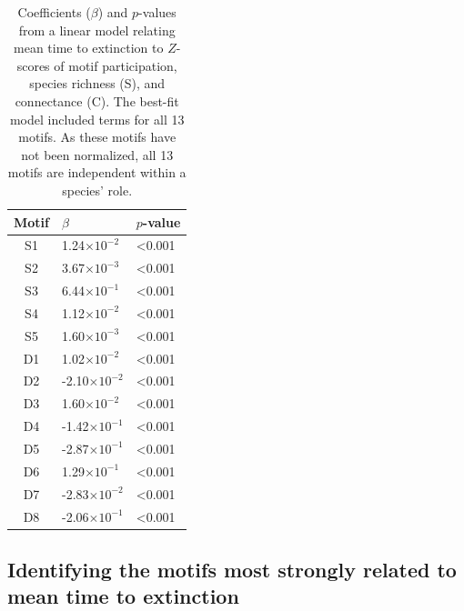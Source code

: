 \documentclass[12pt]{article}
\begin{document}
		\begin{table}
			\caption{Coefficients ($\beta$) and $p$-values from a linear model relating mean time to extinction to $Z$-scores of motif participation, species richness (S), and connectance (C). The best-fit model included terms for all 13 motifs. As these motifs have not been normalized, all 13 motifs are independent within a species' role.}
			\label{motif_lm}
			\begin{tabular}[h]{c |  l l |}
			Motif & $\beta$ & $p$-value \\
			\hline
			S1 & 1.24$\times10^{-2}$ & \textless0.001 \\
			S2 & 3.67$\times10^{-3}$ & \textless0.001 \\
			S3 & 6.44$\times10^{-1}$ & \textless0.001 \\
			S4 & 1.12$\times10^{-2}$ & \textless0.001  \\
			S5 & 1.60$\times10^{-3}$ & \textless0.001  \\
			D1 & 1.02$\times10^{-2}$ & \textless0.001 \\
			D2 & -2.10$\times10^{-2}$ & \textless0.001 \\
			D3 & 1.60$\times10^{-2}$ & \textless0.001 \\
			D4 & -1.42$\times10^{-1}$ & \textless0.001 \\
			D5 & -2.87$\times10^{-1}$ & \textless0.001 \\
			D6 & 1.29$\times10^{-1}$ & \textless0.001 \\
			D7 & -2.83$\times10^{-2}$ & \textless0.001 \\
			D8 & -2.06$\times10^{-1}$ & \textless0.001 \\
			\hline
			\end{tabular}
			\end{table}

        

	\subsection*{Identifying the motifs most strongly related to mean time to extinction}
\end{document}
